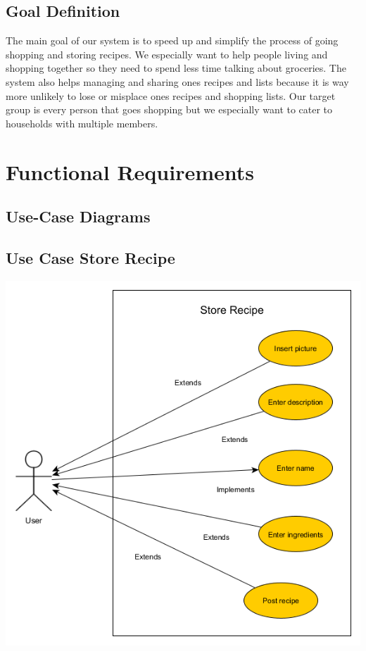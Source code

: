 \documentclass[12pt]{article}
\theoremstyle{definition}
\begin{document}
\subsection{Goal Definition}

The main goal of our system is to speed up and simplify the process of going shopping and storing recipes. We especially want to help people living and shopping together so they need to spend less time talking about groceries. The system also helps managing and sharing ones recipes and lists because it is way more unlikely to lose or misplace ones recipes and shopping lists.
Our target group is every person that goes shopping but we especially want to cater to households with multiple members.

\pagebreak

\section{Functional Requirements}

\subsection{Use-Case Diagrams}

\subsection{Use Case Store Recipe}

\includegraphics[scale=.5]{UseCaseStoreRecipe.png}\\
\end{document}
